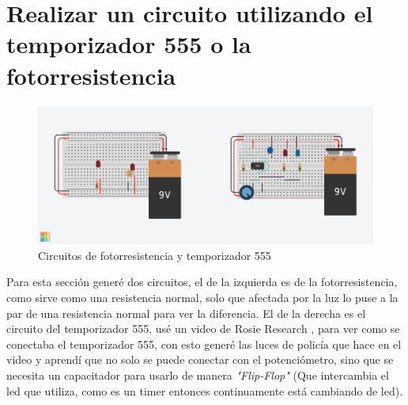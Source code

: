 \documentclass[stu, 12pt, letterpaper, donotrepeattitle, floatsintext, natbib, helv]{apa7}
\begin{document}
\section{Realizar un circuito utilizando el temporizador 555 o la fotorresistencia}
\begin{figure}[H]
    \centering
    \includegraphics[width=1\textwidth]{Circuits.png}
    \caption{Circuitos de fotorresistencia y temporizador 555}
    \label{fig:figureTinkercad}
\end{figure}

\noindent\cite{tinkercad}
Para esta sección generé dos circuitos, el de la izquierda es de la fotorresistencia, como sirve como una resistencia normal, solo que afectada por la luz lo puse a la par de una resistencia normal para ver la diferencia.
El de la derecha es el circuito del temporizador 555, usé un video de Rosie Research \cite{videoTemporizador}, para ver como se conectaba el temporizador 555, con esto generé las luces de policía que hace en el video y aprendí que no solo se puede conectar con el potenciómetro, sino que se necesita un capacitador para usarlo de manera \textit{"Flip-Flop"} (Que intercambia el led que utiliza, como es un timer entonces continuamente está cambiando de led).
\end{document}
